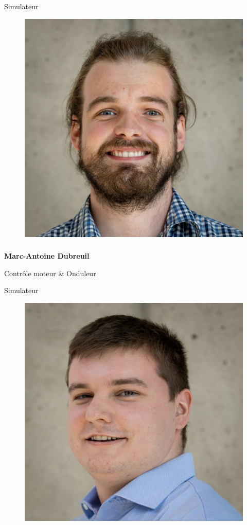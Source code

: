 \documentclass[a0paper,portrait]{baposter}
\begin{document}
\begin{poster}
{Simulateur

\begin{figure}
\includegraphics[width=.9\linewidth]{img/membres/Marc-Antoine-Dubreuil-2.jpg} 
\end{figure}
\subsubsection*{}
\vspace{-2mm}
\textbf{Marc-Antoine Dubreuil}

Contrôle moteur \& Onduleur

Simulateur

\begin{figure}
\includegraphics[width=.9\linewidth]{img/membres/Thomas-Chagnon-3.jpg} 
\end{figure}
}
\end{poster}
\end{document}
